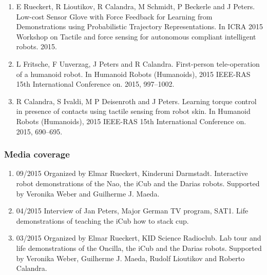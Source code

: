 \begin{enumerate}
\item E Rueckert, R Lioutikov, R Calandra, M Schmidt, P Beckerle and J Peters. Low-cost Sensor Glove with Force Feedback for Learning from Demonstrations using Probabilistic Trajectory Representations. In ICRA 2015 Workshop on Tactile and force sensing for autonomous compliant intelligent robots. 2015.
\item L Fritsche, F Unverzag, J Peters and R Calandra. First-person tele-operation of a humanoid robot. In Humanoid Robots (Humanoids), 2015 IEEE-RAS 15th International Conference on. 2015, 997–1002.
\item R Calandra, S Ivaldi, M P Deisenroth and J Peters. Learning torque control in presence of contacts using tactile sensing from robot skin. In Humanoid Robots (Humanoids), 2015 IEEE-RAS 15th International Conference on. 2015, 690–695.
\end{enumerate}
	
\subsubsection{Media coverage}

\begin{enumerate}
\item 09/2015 Organized by Elmar Rueckert, Kinderuni Darmstadt. Interactive robot demonstrations of the Nao, the iCub and the Darias robots. Supported by Veronika Weber and Guilherme J. Maeda.
\item 04/2015 Interview of Jan Peters, Major German TV program, SAT1. Life demonstrations of teaching the iCub how to stack cup.
\item 03/2015 Organized by Elmar Rueckert, KID Science Radioclub. Lab tour and life demonstrations of the Oncilla, the iCub and the Darias robots. Supported by Veronika Weber, Guilherme J. Maeda, Rudolf Lioutikov and Roberto Calandra.

\end{enumerate}

